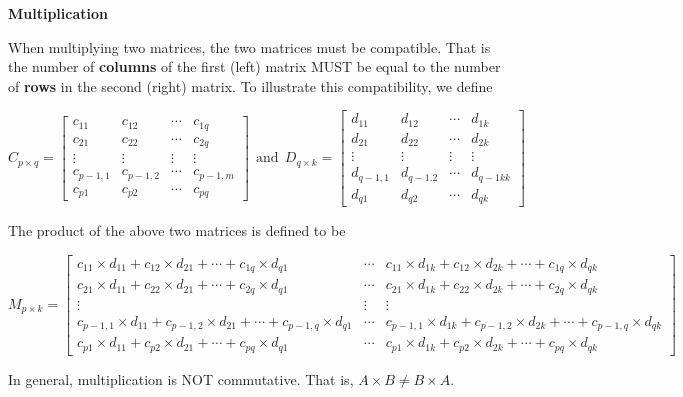 \documentclass[
]{book}
\begin{document}
\textbf{Multiplication}

When multiplying two matrices, the two matrices must be compatible. That is the number of \textbf{columns} of the first (left) matrix MUST be equal to the number of \textbf{rows} in the second (right) matrix. To illustrate this compatibility, we define

\[
C_{p\times q} = \left[\begin{array}{ccccc} 
c_{11} & c_{12} & \cdots & c_{1q}  \\ 
c_{21} & c_{22} & \cdots & c_{2q}  \\ 
\vdots & \vdots & \vdots & \vdots  \\
c_{p-1,1} & c_{p-1,2} & \cdots & c_{p-1,m}  \\
c_{p1} & c_{p2} & \cdots & c_{pq}  
\end{array}
\right]
~
~
\text{and}
~
~
D_{q\times k} = \left[\begin{array}{ccccc} 
d_{11} & d_{12} & \cdots & d_{1k}  \\ 
d_{21} & d_{22} & \cdots & d_{2k}  \\ 
\vdots & \vdots & \vdots & \vdots  \\
d_{q-1,1} & d_{q-1.2} & \cdots & d_{q-1kk}  \\
d_{q1} & d_{q2} & \cdots & d_{qk}  
\end{array}
\right]
\]

The product of the above two matrices is defined to be

\[
M_{p\times k} = \left[\begin{array}{ccccc} 
c_{11}\times d_{11} + c_{12}\times d_{21} + \cdots + c_{1q}\times d_{q1}  & \cdots & c_{11}\times d_{1k} + c_{12}\times d_{2k} + \cdots + c_{1q}\times d_{qk} \\ 
c_{21}\times d_{11} + c_{22}\times d_{21} + \cdots + c_{2q}\times d_{q1}  & \cdots & c_{21}\times d_{1k} + c_{22}\times d_{2k} + \cdots + c_{2q}\times d_{qk} \\ 
\vdots & \vdots & \vdots  \\
c_{p-1,1}\times d_{11} + c_{p-1,2}\times d_{21} + \cdots + c_{p-1,q}\times d_{q1}  & \cdots & c_{p-1,1}\times d_{1k} + c_{p-1,2}\times d_{2k} + \cdots + c_{p-1,q}\times d_{qk}  \\
c_{p1}\times d_{11} + c_{p2}\times d_{21} + \cdots + c_{pq}\times d_{q1}  & \cdots & c_{p1}\times d_{1k} + c_{p2}\times d_{2k} + \cdots + c_{pq}\times d_{qk}  
\end{array}
\right]
\]

In general, multiplication is NOT commutative. That is, \(A\times B \ne B\times A\).
\end{document}
